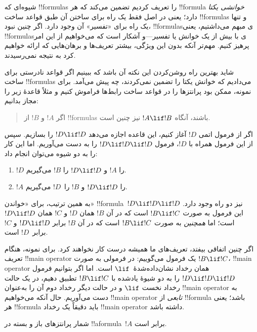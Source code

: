 \documentclass[../../../include/open-logic-section]{subfiles}
\begin{document}


\begin{explain}
شیوه‌ای که !!{formula}s را تعریف کردیم تضمین می‌کند که هر !!{formula}
\emph{خوانشی یکتا} دارد؛ یعنی در اصل فقط یک راه برای ساختن آن طبق قواعد
ساخت !!{formula}s و تنها یک راه برای «تفسیر» آن وجود دارد. اگر چنین نبود،
!!{formula}sی مبهم می‌داشتیم، یعنی !!{formula}sی با بیش از یک خوانش یا
تفسیر---و آشکار است که می‌خواهیم از این امر پرهیز کنیم. مهم‌تر آنکه بدون
این ویژگی، بیشتر تعریف‌ها و برهان‌هایی که ارائه خواهیم کرد به نتیجه
نمی‌رسیدند.

شاید بهترین راه روشن‌کردن این نکته آن باشد که ببینیم اگر قواعد نادرستی برای
ساخت !!{formula}s می‌دادیم که خوانش یکتا را تضمین نمی‌کردند، چه پیش
می‌آمد. برای نمونه، ممکن بود پرانتزها را در قواعد ساخت رابط‌ها فراموش کنیم
و مثلاً قاعدهٔ زیر را مجاز بدانیم:
\begin{quote}
اگر $!A$ و $!B$ از !!{formula}s باشند، آنگاه $!A \lif !B$ نیز چنین است.
\end{quote}
اگر از فرمول اتمی $!D$ آغاز کنیم، این قاعده اجازه می‌دهد $!D \lif !D$ را
بسازیم. سپس از این فرمول همراه با $!D$، فرمول $!D \lif !D \lif !D$ را
به دست می‌آوریم. اما این کار را به دو شیوه می‌توان انجام داد:
\begin{enumerate}
\item $!D$ را $!A$ و $!D \lif !D$ را $!B$ می‌گیریم.
\item $!A$ را $!D \lif !D$ و $!B$ را~$!D$ می‌گیریم.
\end{enumerate}
به همین ترتیب، برای «خواندن» !!{formula}~$!D \lif !D \lif !D$ نیز دو
راه وجود دارد. این فرمول به صورت $!B \lif !C$ است که در آن $!B$ همان
$!D$ و $!C$ همان $!D \lif !D$ است؛ اما \emph{همچنین} به صورت
$!B \lif !C$ است که در آن $!B$ برابر $!D \lif !D$ و $!C$ برابر~$!D$ است.

اگر چنین اتفاقی بیفتد، تعریف‌های ما همیشه درست کار نخواهند کرد. برای نمونه،
هنگام تعریف !!{main operator} یک فرمول می‌گوییم: در فرمولی به صورت
$!B \lif !C$، !!{main operator} همان رخداد نشان‌داده‌شدهٔ~$\lif$ است. اما
اگر بتوانیم فرمول $!D \lif !D \lif !D$ را به دو شیوهٔ یادشده با
$!B \lif !C$ تطبیق دهیم، در یک حالت رخداد نخست $\lif$ و در حالت دیگر
رخداد دوم آن را به‌عنوان !!{main operator} به دست می‌آوریم. حال آنکه
می‌خواهیم !!{main operator} \emph{تابعی} از !!{formula} باشد؛ یعنی هر
!!{formula} باید دقیقاً یک رخداد !!{main operator} داشته باشد.
\end{explain}

\begin{lem}
شمار پرانتزهای باز و بسته در !!a{formula}~$!A$ برابر است.
\end{lem}
\end{document}
